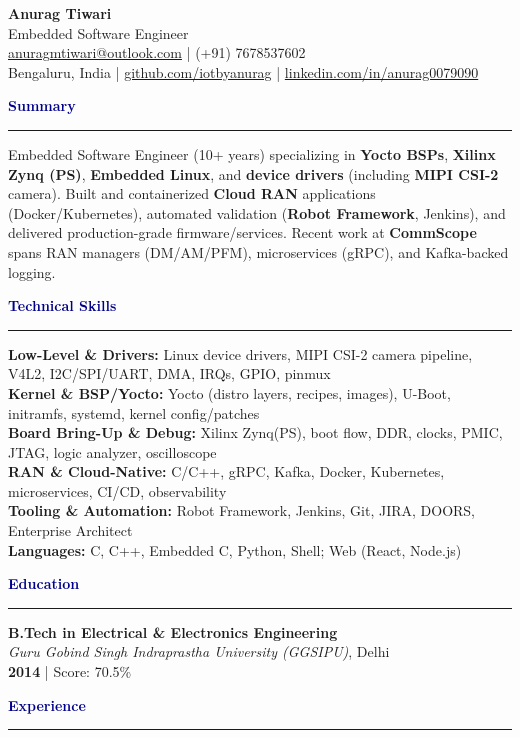 \documentclass[11pt,a4paper]{article}
\newcommand{\ressection}[1]{\vspace{8pt}\textcolor{darkblue}{\textbf{\large #1}}\hrule\vspace{4pt}}
\begin{document}
\begin{center}
{\LARGE \textbf{Anurag Tiwari}}\\[4pt]
Embedded Software Engineer\\[2pt]
\href{mailto:anuragmtiwari@outlook.com}{anuragmtiwari@outlook.com} | (+91) 7678537602\\
Bengaluru, India | \href{https://github.com/iotbyanurag}{github.com/iotbyanurag} | \href{https://linkedin.com/in/anurag0079090}{linkedin.com/in/anurag0079090}
\end{center}

\vspace{8pt}

\ressection{Summary}
Embedded Software Engineer (10+ years) specializing in \textbf{Yocto BSPs}, \textbf{Xilinx Zynq (PS)}, \textbf{Embedded Linux}, and \textbf{device drivers} (including \textbf{MIPI CSI-2} camera). Built and containerized \textbf{Cloud RAN} applications (Docker/Kubernetes), automated validation (\textbf{Robot Framework}, Jenkins), and delivered production-grade firmware/services. Recent work at \textbf{CommScope} spans RAN managers (DM/AM/PFM), microservices (gRPC), and Kafka-backed logging.

\ressection{Technical Skills}
\textbf{Low-Level \& Drivers:} Linux device drivers, MIPI CSI-2 camera pipeline, V4L2, I2C/SPI/UART, DMA, IRQs, GPIO, pinmux\\
\textbf{Kernel \& BSP/Yocto:} Yocto (distro layers, recipes, images), U-Boot, initramfs, systemd, kernel config/patches\\
\textbf{Board Bring-Up \& Debug:} Xilinx Zynq(PS), boot flow, DDR, clocks, PMIC, JTAG, logic analyzer, oscilloscope\\
\textbf{RAN \& Cloud-Native:} C/C++, gRPC, Kafka, Docker, Kubernetes, microservices, CI/CD, observability\\
\textbf{Tooling \& Automation:} Robot Framework, Jenkins, Git, JIRA, DOORS, Enterprise Architect\\
\textbf{Languages:} C, C++, Embedded C, Python, Shell; Web (React, Node.js)

\ressection{Education}
\textbf{B.Tech in Electrical \& Electronics Engineering}\\
\textit{Guru Gobind Singh Indraprastha University (GGSIPU)}, Delhi\\
\textbf{2014} | Score: 70.5\%

\ressection{Experience}
\end{document}
